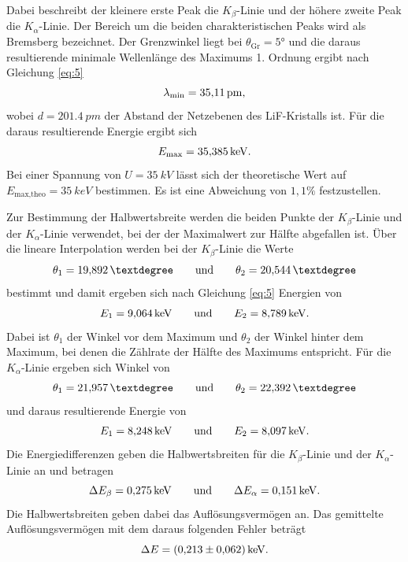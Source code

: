 Dabei beschreibt der kleinere erste Peak die $K_\beta$-Linie und der höhere zweite Peak die $K_\alpha$-Linie.
Der Bereich um die beiden charakteristischen Peaks wird als Bremsberg bezeichnet.
Der Grenzwinkel liegt bei $\theta_\text{Gr} = 5°$ und die daraus resultierende minimale Wellenlänge des Maximums 1. Ordnung ergibt nach Gleichung \ref{eq:5}
\begin{equation}
    \lambda_\text{min} = \SI{35,11}{pm},  \notag
\end{equation}
wobei $d = \SI{201,4}{pm}$ der Abstand der Netzebenen des LiF-Kristalls ist.
Für die daraus resultierende Energie ergibt sich
\begin{equation}
    E_\text{max} = \SI{35,385}{keV}.  \notag
\end{equation}
Bei einer Spannung von $U = \SI{35}{kV}$ lässt sich der theoretische Wert auf $E_\text{max,theo} = \SI{35}{keV}$ bestimmen.
Es ist eine Abweichung von $1,1\%$ festzustellen.

Zur Bestimmung der Halbwertsbreite werden die beiden Punkte der $K_\beta$-Linie und der $K_\alpha$-Linie verwendet, bei der der Maximalwert zur Hälfte abgefallen ist.
Über die lineare Interpolation werden bei der $K_\beta$-Linie die Werte
\begin{equation}
    \theta_1 = \SI{19,892}{°} \qquad \text{und} \qquad \theta_2 = \SI{20,544}{°}  \notag
\end{equation}
bestimmt und damit ergeben sich nach Gleichung \ref{eq:5} Energien von
\begin{equation}
    E_1 = \SI{9,064}{keV} \qquad \text{und} \qquad E_2 = \SI{8,789}{keV}.  \notag
\end{equation}
Dabei ist $\theta_1$ der Winkel vor dem Maximum und $\theta_2$ der Winkel hinter dem Maximum, bei denen die Zählrate der Hälfte des Maximums entspricht.
Für die  $K_\alpha$-Linie ergeben sich Winkel von
\begin{equation}
    \theta_1 = \SI{21,957}{°} \qquad \text{und} \qquad \theta_2 = \SI{22,392}{°}  \notag
\end{equation}
und daraus resultierende Energie von
\begin{equation}
    E_1 = \SI{8,248}{keV}\qquad \text{und} \qquad E_2 = \SI{8,097}{keV}.  \notag
\end{equation}
Die Energiedifferenzen geben die Halbwertsbreiten für die $K_\beta$-Linie und der $K_\alpha$-Linie an und betragen
\begin{equation}
  \Delta E_\beta = \SI{0,275}{keV} \qquad \text{und} \qquad \Delta E_\alpha = \SI{0,151}{keV}.  \notag
\end{equation}
Die Halbwertsbreiten geben dabei das Auflösungsvermögen an.
Das gemittelte Auflösungsvermögen mit dem daraus folgenden Fehler beträgt
\begin{equation}
    \Delta E = \SI{0.213 \pm 0.062}{keV}. \notag
\end{equation}

